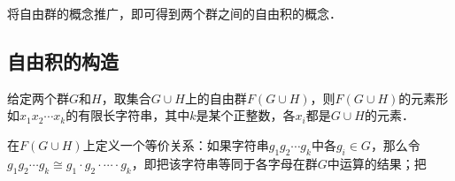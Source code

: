 
将自由群的概念推广，即可得到两个群之间的自由积的概念．

\subsection{自由积的构造}

给定两个群$G$和$H$，取集合$G\cup H$上的自由群$F(G\cup H)$，则$F(G\cup H)$的元素形如$x_1x_2\cdots x_k$的有限长字符串，其中$k$是某个正整数，各$x_i$都是$G\cup H$的元素．

在$F(G\cup H)$上定义一个等价关系：如果字符串$g_1g_2\cdots g_k$中各$g_i\in G$，那么令$g_1g_2\cdots g_k\cong g_1\cdot g_2\cdot\cdots\cdot g_k$，即把该字符串等同于各字母在群$G$中运算的结果；把